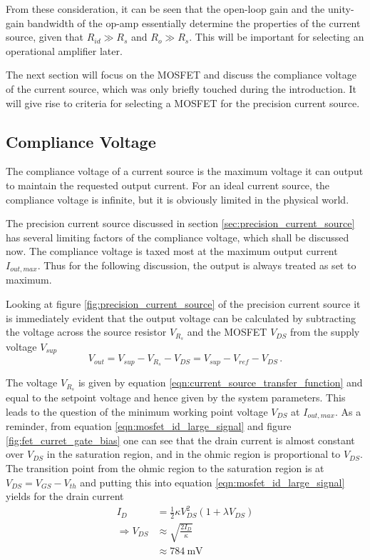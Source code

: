 From these consideration, it can be seen that the open-loop gain and the unity-gain bandwidth of the op-amp essentially determine the properties of the current source, given that $R_{id} \gg R_s$ and $R_o \gg R_s$. This will be important for selecting an operational amplifier later.

The next section will focus on the MOSFET and discuss the compliance voltage of the current source, which was only briefly touched during the introduction. It will give rise to criteria for selecting a MOSFET for the precision current source.

\subsection{Compliance Voltage}%
\label{sec:compliance_voltage}
The compliance voltage of a current source is the maximum voltage it can output to maintain the requested output current. For an ideal current source, the compliance voltage is infinite, but it is obviously limited in the physical world.

The precision current source discussed in section \ref{sec:precision_current_source} has several limiting factors of the compliance voltage, which shall be discussed now. The compliance voltage is taxed most at the maximum output current $I_{out,max}$. Thus for the following discussion, the output is always treated as set to maximum.

Looking at figure \ref{fig:precision_current_source} of the precision current source it is immediately evident that the output voltage can be calculated by subtracting the voltage across the source resistor $V_{R_s}$ and the MOSFET $V_{DS}$ from the supply voltage $V_{sup}$
\begin{equation*}
    V_{out} = V_{sup} - V_{R_s} - V_{DS} = V_{sup} - V_{ref} - V_{DS}\,.
\end{equation*}

The voltage $V_{R_s}$ is given by equation \ref{eqn:current_source_transfer_function} and equal to the setpoint voltage and hence given by the system parameters. This leads to the question of the minimum working point voltage $V_{DS}$ at $I_{out,max}$. As a reminder, from equation \ref{eqn:mosfet_id_large_signal} and figure \ref{fig:fet_curret_gate_bias} one can see that the drain current is almost constant over $V_{DS}$ in the saturation region, and in the ohmic region is proportional to $V_{DS}$. The transition point from the ohmic region to the saturation region is at $V_{DS} = V_{GS} - V_{th}$ and putting this into equation \ref{eqn:mosfet_id_large_signal} yields for the drain current
\begin{align}
    I_D &= \frac{1}{2} \kappa V_{DS}^2 \left(1+ \lambda V_{DS}\right) \nonumber\\
    \Rightarrow V_{DS} &\approx \sqrt{\frac{2 I_D}{\kappa}}\\
    &\approx \qty{784}{\mV}
\end{align}

